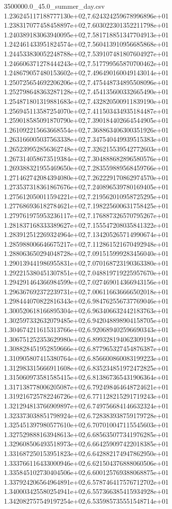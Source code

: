 \begin{filecontents*}{3500000.0_45.0_summer_day.csv}
1.236245117188777130e+02,7.624324259678996896e+01
1.238317077458458897e+02,7.603022301352211798e+01
1.240389183063940095e+02,7.581718851347704913e+01
1.242461433951824574e+02,7.560413910956685868e+01
1.244533830052248788e+02,7.539107481807604927e+01
1.246606371278444243e+02,7.517799565870700462e+01
1.248679057480153602e+02,7.496490160049143014e+01
1.250725654692206206e+02,7.475448734895508096e+01
1.252798648363287128e+02,7.454135600332665490e+01
1.254871801319881683e+02,7.432820500911839190e+01
1.256945113587254070e+02,7.411503434935184487e+01
1.259018585091870790e+02,7.390184402664544905e+01
1.261092215663668554e+02,7.368863406300351926e+01
1.263166005037563338e+02,7.347540449939515383e+01
1.265239952856362748e+02,7.326215539542772603e+01
1.267314058673519384e+02,7.304888682896580576e+01
1.269388321955469650e+02,7.283559889568459766e+01
1.271462742084394080e+02,7.262229170862974570e+01
1.273537318361867676e+02,7.240896539780169405e+01
1.275612050011594221e+02,7.219562010958725295e+01
1.277686936182784621e+02,7.198225600631758425e+01
1.279761975953236117e+02,7.176887326570795267e+01
1.281837168333389627e+02,7.155547208035841322e+01
1.283912512269324964e+02,7.134205265714990674e+01
1.285988006646675217e+02,7.112861521670492948e+01
1.288063650294048728e+02,7.091515999283456040e+01
1.290139441986955831e+02,7.070168723190363380e+01
1.292215380451307851e+02,7.048819719225957670e+01
1.294291464366984599e+02,7.027469014366943156e+01
1.296367692372239731e+02,7.006116636666502018e+01
1.298444070822816343e+02,6.984762556737769046e+01
1.300520618166895304e+02,6.963406632442183763e+01
1.302597332632079485e+02,6.942048898904158705e+01
1.304674211615313766e+02,6.920689402596690343e+01
1.306751252353629980e+02,6.899328194062309194e+01
1.308828451952859666e+02,6.877965327454876387e+01
1.310905807415380764e+02,6.856600860083199223e+01
1.312983315666911608e+02,6.835234851972472825e+01
1.315060973581585415e+02,6.813867365431906364e+01
1.317138778006205087e+02,6.792498464648724621e+01
1.319216725782246726e+02,6.771128215291719243e+01
1.321294813766909897e+02,6.749756684146632324e+01
1.323373038851798924e+02,6.728383938759179728e+01
1.325451397980577610e+02,6.707010047115545603e+01
1.327529888163948613e+02,6.685635077341976285e+01
1.329608506493518973e+02,6.664259097422018385e+01
1.331687250153951823e+02,6.642882174947862950e+01
1.333766116433000946e+02,6.621504376888060506e+01
1.335845102730404506e+02,6.600125769388068875e+01
1.337924206564964891e+02,6.578746417576712702e+01
1.340003425580254941e+02,6.557366385415934928e+01
1.342082757549197254e+02,6.535985735551548714e+01

\end{filecontents*}
